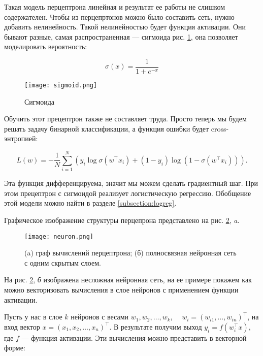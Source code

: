 \bigskip
Такая модель перцептрона линейная и результат ее работы не слишком содержателен. Чтобы из перцепртонов можно
было составить сеть, нужно добавить нелинейность. Такой нелинейностью будет функция активации. Они бывают
разные, самая распространенная --- сигмоида рис. \ref{fig:sigmoid}, она позволяет моделировать вероятность:

\begin{equation} \label{eq:sigma}
    \sigma (x) = \frac{1}{1+e^{-x}}
\end{equation}

\begin{figure}[ht]
    \centering
    \texttt{[image: sigmoid.png]}
    \caption{Сигмоида}
    \label{fig:sigmoid}
\end{figure}

Обучить этот прецептрон также не составляет труда. Просто теперь мы будем решать задачу бинарной
классификации, а функция ошибки будет cross-энтропией:

\begin{equation}
 L(w) = -\frac{1}{N}\sum_{i=1}^N(y_i\log\sigma(w^\top x_i) + (1-y_i)\log(1-\sigma(w^\top x_i))).
\end{equation}

Эта функция дифференцируема, значит мы можем сделать градиентный шаг. При этом прецептрон с сигмоидой
реализует логистическую регрессию. Обобщение этой модели можно найти в разделе \ref{subsection:logreg}.

\bigskip
Графическое изображение структуры перцепрона представлено на рис. \ref{fig:neuron}, \textit{a}.

\begin{figure}[ht]
    \centering
    \texttt{[image: neuron.png]}
    \caption{(a) граф вычислений перцептрона; (б) полносвязная нейронная сеть с одним скрытым слоем.}
    \label{fig:neuron}
\end{figure}

На  рис. \ref{fig:neuron}, \textit{б} изображена несложная нейронная сеть, на ее примере покажем как можно векторизовать вычисления в слое нейронов с применением функции активации.

\bigskip
Пусть у нас в слое $k$ нейронов с весами $w_1, w_2, \ldots, w_k$, $\quad w_i = (w_{i1}, \ldots, w_{in})^\top$, на вход вектор $x = (x_1, x_2, \ldots, x_n)^\top$. В результате получим выход $y_i = f(w_i^\top x)$, где $f$ --- функция активации. Эти вычисления можно представить в векторной форме:

